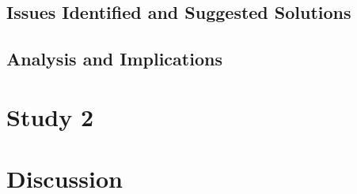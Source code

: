 \subsection{Issues Identified and Suggested Solutions}



\subsection{Analysis and Implications}







\section{Study 2\label{Hardware:Study 2}}













\section{Discussion\label{Hardware:Discussion}}









